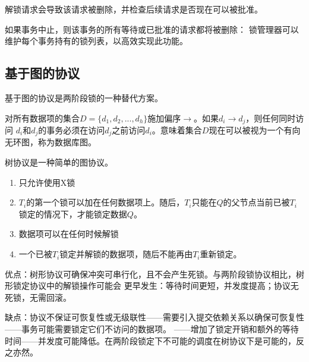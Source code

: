 解锁请求会导致该请求被删除，并检查后续请求是否现在可以被批准。

如果事务中止，则该事务的所有等待或已批准的请求都将被删除：
锁管理器可以维护每个事务持有的锁列表，以高效实现此功能。

\subsection{基于图的协议}

基于图的协议是两阶段锁的一种替代方案。

对所有数据项的集合$D=\{d_1,d_2,...,d_h\}$施加偏序$\to$。如果$d_i\to d_j$，则任何同时访问
$d_i$和$d_j$的事务必须在访问$d_j$之前访问$d_i$。意味着集合$D$现在可以被视为一个有向无环图，称为数据库图。

树协议是一种简单的图协议。

\begin{enumerate}
    \item 只允许使用X锁
    \item $T_i$的第一个锁可以加在任何数据项上。随后，$T_i$只能在$Q$的父节点当前已被$T_i$锁定的情况下，才能锁定数据$Q$。
    \item 数据项可以在任何时候解锁
    \item 一个已被$T_i$锁定并解锁的数据项，随后不能再由$T_i$重新锁定。
\end{enumerate}

优点：树形协议可确保冲突可串行化，且不会产生死锁。与两阶段锁协议相比，树形锁定协议中的解锁操作可能会
更早发生：等待时间更短，并发度提高；协议无死锁，无需回滚。

缺点：协议不保证可恢复性或无级联性——需要引入提交依赖关系以确保可恢复性——事务可能需要锁定它们不访问的数据项。
——增加了锁定开销和额外的等待时间——并发度可能降低。在两阶段锁定下不可能的调度在树协议下是可能的，反之亦然。